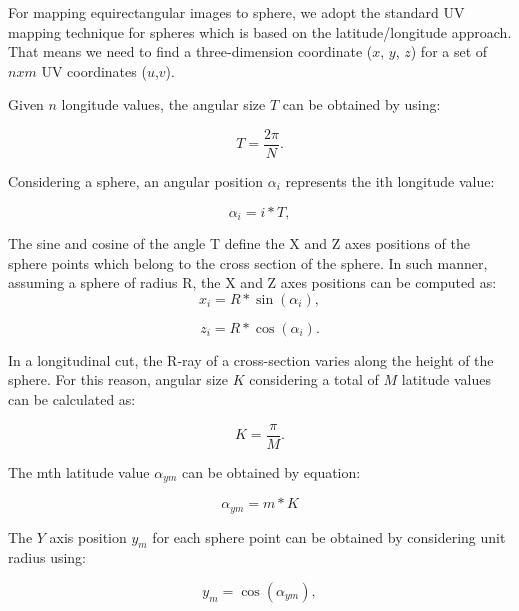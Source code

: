 \documentclass[10pt,conference,pdftex]{IEEEtran}
\begin{document}
For mapping equirectangular images to sphere, we adopt the standard UV mapping technique for spheres which is based on the latitude/longitude approach. That means we need to find a three-dimension coordinate ($x$, $y$, $z$) for a set of $n x m$ UV coordinates ($u$,$v$).

Given $n$ longitude values, the angular size $T$ can be obtained by using:

\begin{equation}
T = \frac{2 \pi}{N}.
\label{longitudesize}
\end{equation}

Considering a sphere, an angular position $\alpha_{i}$ represents the ith longitude value:

\begin{equation}
\alpha_{i} = i * T,
\label{longitudealpha}
\end{equation}

The sine and cosine of the angle T define the X and Z axes positions of the sphere points which belong to the cross section of the sphere. In such manner, assuming a sphere of radius R, the X and Z axes positions can be computed as:
\begin{equation}
x_{i} = R * \sin(\alpha_{i}),
\label{x_d}
\end{equation}

\begin{equation}
z_{i} = R * \cos(\alpha_{i}).
\label{z_d}
\end{equation}

In a longitudinal cut, the R-ray of a cross-section varies along the height of the sphere. For this reason, angular size $K$ considering a total of $M$ latitude values can be calculated as:

\begin{equation}
K = \frac{\pi}{M}.
\label{equation5}
\end{equation}

The mth latitude value $\alpha_{ym}$ can be obtained by equation:

\begin{equation}
\alpha_{ym} = m * K
\label{equation6}
\end{equation}

The $Y$ axis position $y_{m}$ for each sphere point can be obtained by considering unit radius using:

\begin{equation}
y_{m} = \cos(\alpha_{ym}),
\label{equation7}
\end{equation}
\end{document}
